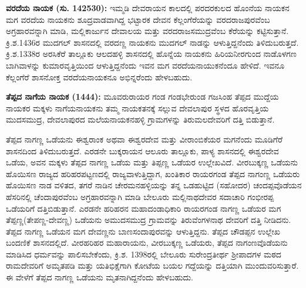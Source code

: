 \textbf{ವರದೆಯ ನಾಯಕ (ಸು. 1425\general{\enginline{-}}30):} ಇಮ್ಮಡಿ ದೇವರಾಯನ ಕಾಲದಲ್ಲಿ ಪರದರಕುಲದ ಹೊಂನೆಯ ನಾಯಕನ ಮಗ ವರದೆಯ ನಾಯಕನು ಶೂದ್ರವಾಡವಾಗಿದ್ದ ಭಟ್ಟಾರಕ ದೇವನ ಕೆಲ್ಲಂಗೆರೆಯನ್ನು ವರದರಾಜಪುರವೆಂಬ ಅಗ್ರಹಾರವನ್ನಾಗಿ ಮಾಡಿ, ಮಲ್ಲಿಕಾರ್ಜುನ ದೇವಾಲಯ ಮತ್ತು ವರದರಾಜಸಮುದ್ರವೆಂಬ ಕೆರೆಯನ್ನು ಕಟ್ಟಿಸುತ್ತಾನೆ. ಕ್ರಿ.ಶ.1436ರ ಮುದಗಲ್​ ಶಾಸನದಲ್ಲಿ ವರದಣ್ಣ ನಾಯಕನು ಮುದಗಲ್​ ನಾಡನ್ನು ಆಳುತ್ತಿದ್ದನೆಂದು ತಿಳಿದುಬರುತ್ತದೆ. ಕ್ರಿ.ಶ.1338ರ ಅರಸಿಕೆರೆ ತಾಲ್ಲೂಕು ಆಲದಹಳ್ಳಿ ಶಾಸನದಲ್ಲಿ ಹೊನ್ನೆಯ ನಾಯಕನು ಹಿರಿಯನೀರಗುಂದ ನಾಡೊಳಗಣ ಬಾಗಿವಾಳನ್ನು ಕುಮಾರವೃತ್ತಿಯಿಂದ ಆಳುತ್ತಿದ್ದನೆಂದು ಇವನ ಮಗ ವರದೆಯನಾಯುಕನೆಂದೂ ಹೇಳಿದೆ. ಇವನೂ ಕೆಲ್ಲಂಗೆರೆ ಶಾಸನೋಕ್ತ ವರದೆಯನಾಯಕನೂ ಅಭಿನ್ನರೆಂದು ಹೇಳಬಹುದು.

\textbf{ತೆಪ್ಪದ ನಾಗೆಯ ನಾಯಕ (1444): }ಮೂವರುರಾಯರ ಗಂಡ ಗಂಡಭೇರುಂಡ ಗಜಸಿಂಹ ತೆಪ್ಪದ ಮುದ್ದೆಯ ನಾಯಕರ ಮಕ್ಕಳು ನಾಗೆಯನಾಯಕನು ತಮ್ಮ ನಾಯಕತನಕ್ಕೆ ಸಲ್ಲುವ ದೇವಲಾಪುರ ಸ್ಥಳದ ಹೊರವೃತ್ತಿಯ ಮುದಸಮುದ್ರ, ದೇವಲಾಪುರದ ಮಲೆಯನಾಯಕನಹಳ್ಳಿ ಗ್ರಾಮಗಳನ್ನು ತಿರುಮಲದೇವರಿಗೆ ದತ್ತಿ ಬಿಡುತ್ತಾನೆ.

ತೆಪ್ಪದ ನಾಗಣ್ಣ ಒಡೆಯನು ಈಶ್ವರಾಂಕ ಅಥವಾ ಈಶ್ವರದೇವ ಮತ್ತು ವೀರಾಂಬಿಕೆಯರ ಮಗನೆಂದು ಮೂಡಿಗೆರೆ ಶಾಸನದಿಂದ ತಿಳಿದುಬರುತ್ತದೆ. ಎರಡನೇ ಬುಕ್ಕರಾಯನ ಆಲೂರು ತಾಲ್ಲೂಕು, ಪಾಳ್ಯ ಶಾಸನದಲ್ಲಿ ಈಶ್ವರದೇವ ಒಡೆಯ, ಅವನ ಮಕ್ಕಳು ತೆಪ್ಪದ ನಾಗಣ್ಣ ಒಡೆಯ ಮತ್ತು ತಿಪ್ಪಣ್ಣ ಒಡೆಯರ ಉಲ್ಲೇಖವಿದೆ. ವೀರಬುಕ್ಕಣ್ಣ ಒಡೆಯನು ಹೊಯಿಸಣ ರಾಜ್ಯದ ಹರಿಹರಪಟ್ಟಣದಲ್ಲಿ ರಾಜ್ಯವಾಳುತ್ತಿದ್ದಾಗ, ಖಂತಿಕಾರ ರಾಯರಗಂಡ ತೆಪ್ಪದ ನಾಗಂಣ್ಣ ಒಡೆಯರು ಹೊಯಿಸಣ ನಾಡ ವಳಿತದ, ತಗರೆ ನಾಡಿನ ಚೇರಮನಹಳ್ಳಿಯನ್ನು ತನ್ನ ಒಡಹುಟ್ಟಿದ (ಸಹೋದರ) ಚಂದಪ್ಪವೊಡೆಯನ ಹೆಸರಿನಲ್ಲಿ ಚೆಂದಾಪುರವೆಂಬ ಅಗ್ರಹಾರವನ್ನಾಗಿ ಮಾಡಿ ಬೇಲೂರು ಮಲ್ಲಿನಾಥದೇವರ ಸದಾಚಾರಿ ಗಂಭೀರಪ್ಪ ಒಡೆಯರಿಗೆ ದತ್ತಿಬಿಡುತ್ತಾನೆ. ಎರಡನೇ ಹರಿಹರನ ಮಹಾದಂಡಾಧಿಕಾರಿ ರಾಯರಗಂಡ ನಾಗಣ್ಣ ಒಡೆಯರ ಮಗ ತೆಪ್ಪಣ್ಣ(ತೇಪಣ್ಣ-\break ದೇವಣ್ಣ) ಒಡೆಯನು ಅಮುದಸಮುದ್ರ ಗ್ರಾಮವನ್ನು ತಿರುವೆಂಗಳನಾಥ ದೇವರಿಗೆ ದತ್ತಿ ನೀಡಿದನು. ತೆಪ್ಪದ ನಾಗಣ್ಣ ಒಡೆಯನ ಮಗ ದೇವಣ್ಣನು ಬಾಣಸಂದಾಪುರವನ್ನು ಆಳುತ್ತಿದ್ದನು. ತೆಪ್ಪದ ಚೌಡಪ್ಪನ ಉಲ್ಲೇಖ ಬಂದಣಿಕೆ ಶಾಸನದಲ್ಲಿದೆ. ವೀರಹರಿಹರ ಮಹಾರಾಯನು, ವೀರಬುಕ್ಕಣ್ಣ ಒಡೆಯರು, ತೆಪ್ಪದ ನಾಗಂಣವೊಡೆಯನು ಮಾಡಿಸಿದ ಧರ್ಮವನ್ನು ಪಾಲಿಸ\-ಬೇಕೆಂದು, ಕ್ರಿ.ಶ. 1398ರಲ್ಲಿ ಬೇಲೂರು ಸುರೇಂದ್ರತೀರ್ಥ ಶ‍್ರೀಪಾದಗಳ ಮಠದ ರಾಮದೇವರಿಗೆ ಅಮೃತಪಡಿ ಮತ್ತು ಯತಿಭಿಕ್ಷೆಗಾಗಿ ಕೋಟೆಯ ಬಯಲ ಗದ್ದೆಯನ್ನು ದತ್ತಿಯಾಗಿ ಮುಂದುವರಿಸುತ್ತಾರೆ. ಈ ವೇಳೆಗೆ ತೆಪ್ಪದ ನಾಗಣ್ಣ ಒಡೆಯನು ಮೃತನಾಗಿದ್ದನೆಂದು ಹೇಳಬಹುದು.

